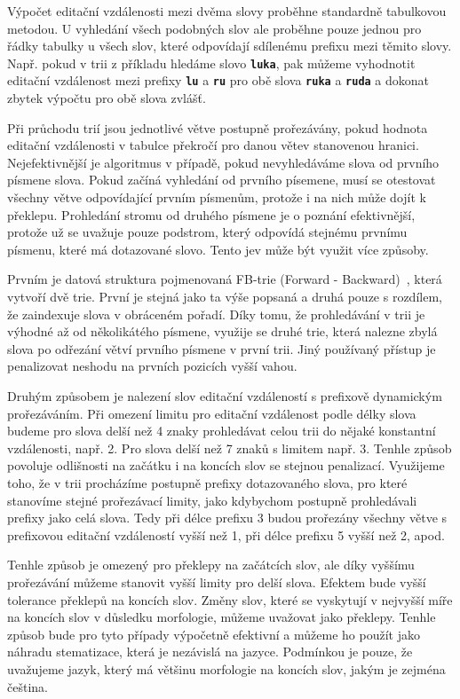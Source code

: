 \documentclass[11pt,letterpaper,oneside,openright]{book}
\newcommand{\bftt}[1]{\texttt{\textbf{#1}}}
\begin{document}
Výpočet editační vzdálenosti mezi dvěma slovy proběhne standardně tabulkovou
metodou. U vyhledání všech podobných slov ale proběhne pouze jednou pro řádky
tabulky u všech slov, které odpovídají sdílenému prefixu mezi těmito slovy.
Např. pokud v trii z příkladu hledáme slovo \bftt{luka}, pak můžeme vyhodnotit
editační vzdálenost mezi prefixy \bftt{lu} a \bftt{ru} pro obě slova
\bftt{ruka} a \bftt{ruda} a dokonat zbytek výpočtu pro obě slova zvlášť.

Při průchodu trií jsou jednotlivé větve postupně prořezávány, pokud hodnota
editační vzdálenosti v tabulce překročí pro danou větev stanovenou hranici.
Nejefektivnější je algoritmus v případě, pokud nevyhledáváme slova od prvního
písmene slova. Pokud začíná vyhledání od prvního písemene, musí se otestovat
všechny větve odpovídající prvním písmenům, protože i na nich může dojít k
překlepu. Prohledání stromu od druhého písmene je o poznání efektivnější,
protože už se uvažuje pouze podstrom, který odpovídá stejnému prvnímu písmenu,
které má dotazované slovo. Tento jev může být využit více způsoby.

Prvním je datová struktura pojmenovaná FB-trie (Forward -
Backward)~\cite{Boytsov:2011:IMA:1963190.1963191}, která vytvoří dvě trie.
První je stejná jako ta výše popsaná a druhá pouze s rozdílem, že zaindexuje
slova v obráceném pořadí. Díky tomu, že prohledávání v trii je výhodné až od
několikátého písmene, využije se druhé trie, která nalezne zbylá slova po
odřezání větví prvního písmene v první trii. Jiný používaný přístup je
penalizovat neshodu na prvních pozicích vyšší vahou.

Druhým způsobem je nalezení slov editační vzdáleností s prefixově dynamickým
prořezáváním. Při omezení limitu pro editační vzdálenost podle délky slova
budeme pro slova delší než 4 znaky prohledávat celou trii do nějaké konstantní
vzdálenosti, např. 2. Pro slova delší než 7 znaků s limitem např. 3. Tenhle
způsob povoluje odlišnosti na začátku i na koncích slov se stejnou penalizací.
Využijeme toho, že v trii procházíme postupně prefixy dotazovaného slova, pro
které stanovíme stejné prořezávací limity, jako kdybychom postupně prohledávali
prefixy jako celá slova. Tedy při délce prefixu 3 budou prořezány všechny větve
s prefixovou editační vzdáleností vyšší než 1, při délce prefixu 5 vyšší než 2,
apod.

Tenhle způsob je omezený pro překlepy na začátcích slov, ale díky vyššímu
prořezávání můžeme stanovit vyšší limity pro delší slova. Efektem bude vyšší
tolerance překlepů na koncích slov. Změny slov, které se vyskytují v nejvyšší
míře na koncích slov v důsledku morfologie, můžeme uvažovat jako překlepy.
Tenhle způsob bude pro tyto případy výpočetně efektivní a můžeme ho použít jako
náhradu stematizace, která je nezávislá na jazyce. Podmínkou je pouze, že
uvažujeme jazyk, který má většinu morfologie na koncích slov, jakým je zejména
čeština.
\end{document}

